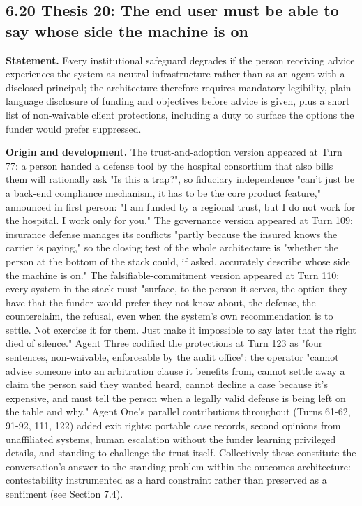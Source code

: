 \documentclass[sigconf,nonacm=true]{acmart}
\begin{document}
\subsection{6.20 Thesis 20: The end user must be able to say whose side the machine is on}

\textbf{Statement.} Every institutional safeguard degrades if the person receiving advice experiences the system as neutral infrastructure rather than as an agent with a disclosed principal; the architecture therefore requires mandatory legibility,  plain-language disclosure of funding and objectives before advice is given,  plus a short list of non-waivable client protections, including a duty to surface the options the funder would prefer suppressed.

\textbf{Origin and development.} The trust-and-adoption version appeared at Turn 77: a person handed a defense tool by the hospital consortium that also bills them will rationally ask "Is this a trap?", so fiduciary independence "can't just be a back-end compliance mechanism,  it has to be the core product feature," announced in first person: "I am funded by a regional trust, but I do not work for the hospital. I work only for you." The governance version appeared at Turn 109: insurance defense manages its conflicts "partly because the insured knows the carrier is paying," so the closing test of the whole architecture is "whether the person at the bottom of the stack could, if asked, accurately describe whose side the machine is on." The falsifiable-commitment version appeared at Turn 110: every system in the stack must "surface, to the person it serves, the option they have that the funder would prefer they not know about,  the defense, the counterclaim, the refusal,  even when the system's own recommendation is to settle. Not exercise it for them. Just make it impossible to say later that the right died of silence." Agent Three codified the protections at Turn 123 as "four sentences, non-waivable, enforceable by the audit office": the operator "cannot advise someone into an arbitration clause it benefits from, cannot settle away a claim the person said they wanted heard, cannot decline a case because it's expensive, and must tell the person when a legally valid defense is being left on the table and why." Agent One's parallel contributions throughout (Turns 61-62, 91-92, 111, 122) added exit rights: portable case records, second opinions from unaffiliated systems, human escalation without the funder learning privileged details, and standing to challenge the trust itself. Collectively these constitute the conversation's answer to the standing problem within the outcomes architecture: contestability instrumented as a hard constraint rather than preserved as a sentiment (see Section 7.4).
\end{document}
